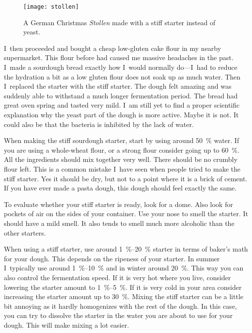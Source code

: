\begin{figure}[!htb]
  \texttt{[image: stollen]}
  \caption[Christmas \emph{Stollen}]{A German Christmas \emph{Stollen} made
      with a stiff starter instead of yeast.}%
  \label{fig:stollen}
\end{figure}

I~then proceeded and bought a cheap low-gluten cake flour in my nearby supermarket.
This flour before had caused me massive headaches in the past. I~made a sourdough bread
exactly how I~would normally do---I~had to reduce the hydration a bit as a low
gluten flour does not soak up as much water. Then I~replaced the starter with
the stiff starter. The dough felt amazing and was suddenly able to withstand a
much longer fermentation period. The bread had great oven spring and tasted
very mild. I~am still yet to find a proper scientific explanation why the yeast part of
the dough is more active. Maybe it is not. It could also be that the bacteria
is inhibited by the lack of water.

When making the stiff sourdough starter, start by using around \qty{50}{\percent}
water. If you are using a whole-wheat flour, or a strong flour consider going
up to \qty{60}{\percent}. All the ingredients should mix together very well. There
should be no crumbly flour left. This is a common mistake I~have seen when
people tried to make the stiff starter. Yes it should be dry, but not to a
point where it is a brick of cement. If you have ever made a pasta dough, this
dough should feel exactly the same.

To evaluate whether your stiff starter is ready, look for a dome. Also look for
pockets of air on the sides of your container. Use your nose to smell the
starter. It should have a mild smell. It also tends to smell much more
alcoholic than the other starters.

When using a stiff starter, use around \qtyrange{1}{20}{\percent} starter in terms of
baker's math for your
dough. This depends on the ripeness of your starter.
In summer I~typically use around
\qtyrange{1}{10}{\percent} and in winter around \qty{20}{\percent}. This way you can
also control the fermentation speed. If it is very hot where you live, consider
lowering the starter amount to \qtyrange{1}{5}{\percent}. If it is very cold in your
area consider increasing the starter amount up to \qty{30}{\percent}.
Mixing the stiff starter can be a little bit annoying as it hardly homogenizes with
the rest of the dough. In this case, you can try to dissolve the starter in the
water you are about to use for your dough. This will make mixing a lot easier.


